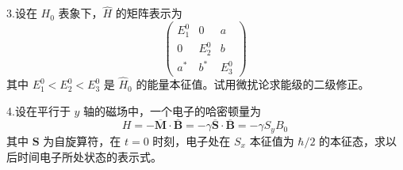 3.设在 $H_0$ 表象下，$\hat{H}$ 的矩阵表示为
$$\begin{pmatrix}
E_1^0 & 0 & a \\
0 & E_2^0 & b \\
a^* & b^* & E_3^0
\end{pmatrix}~$$
其中 $E_1^0 < E_2^0 < E_3^0$ 是 $\hat{H}_0$ 的能量本征值。试用微扰论求能级的二级修正。

4.设在平行于 $y$ 轴的磁场中，一个电子的哈密顿量为
$$H = -\overline{\mathbf{M}} \cdot \overline{\mathbf{B}} = -\gamma \overline{\mathbf{S}} \cdot \overline{\mathbf{B}} = -\gamma S_y B_0~$$
其中 $\mathbf{S}$ 为自旋算符，在 $t = 0$ 时刻，电子处在 $S_x$ 本征值为 $\hbar/2$ 的本征态，求以后时间电子所处状态的表示式。
